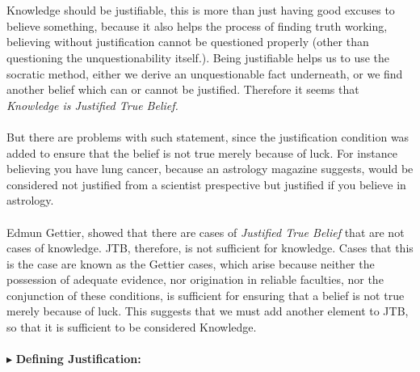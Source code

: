 \documentclass[9pt,a4paper,twocolumn]{article}
\newcommand{\newpoint}[1]{\indent$\blacktriangleright$ \textbf{#1}}
\begin{document}
                \\
                \\
                Knowledge should be justifiable, this is more than just having good excuses to believe something, because it also helps the process of finding truth working, believing without justification cannot be questioned properly (other than questioning the unquestionability itself.). Being justifiable helps us to use the socratic method, either we derive an unquestionable fact underneath, or we find another belief which can or cannot be justified. Therefore it seems that \textit{Knowledge is Justified True Belief.}
                \\
                \\
                But there are problems with such statement, since the justification condition was added to ensure that the belief is not true merely because of luck. For instance believing you have lung cancer, because an astrology magazine suggests, would be considered not justified from a scientist prespective but justified if you believe in astrology.
                \\
                \\
                Edmun Gettier, showed that there are cases of \textit{Justified True Belief} that are not cases of knowledge. JTB, therefore, is not sufficient for knowledge. Cases that this is the case are known as the Gettier cases, which arise because neither the possession of adequate evidence, nor origination in reliable faculties, nor the conjunction of these conditions, is sufficient for ensuring that a belief is not true merely because of luck. This suggests that we must add another element to JTB, so that it is sufficient to be considered Knowledge.\cite{sep-epistemology}
                \\
                \\
                \newpoint{Defining Justification:}

        
        
        
        
        
        
        
        
        
        
        
        
        
        \newpage
        
        
\end{document}
